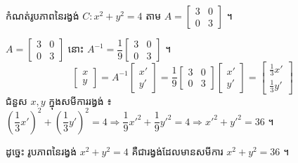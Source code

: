 \begin{example}[លំហាត់គំរូ ២]
កំណត់រូបភាពនៃរង្វង់ $C : x^2 + y^2 = 4$ តាម $A = \begin{bmatrix} 3 & 0\\ 0 & 3 \end{bmatrix}$ ។
\end{example}
\ans
$A = \begin{bmatrix} 3 & 0\\ 0 & 3 \end{bmatrix}$ នោះ $A^{-1} = \dfrac{1}{9}\begin{bmatrix} 3 & 0\\ 0 & 3 \end{bmatrix}$ ។
\[ \begin{bmatrix} x\\ y \end{bmatrix} = A^{-1}\begin{bmatrix} x'\\ y' \end{bmatrix} = \frac{1}{9}\begin{bmatrix} 3 & 0\\ 0 & 3 \end{bmatrix}\begin{bmatrix} x'\\ y' \end{bmatrix} = \begin{bmatrix} \frac{1}{3}x'\\[2pt] \frac{1}{3}y' \end{bmatrix} \]
ជំនួស $x, y$ ក្នុងសមីការរង្វង់ ៖ $\left(\dfrac{1}{3}x'\right)^2 + \left(\dfrac{1}{3}y'\right)^2 = 4 \Rightarrow \dfrac{1}{9}x'^2 + \dfrac{1}{9}y'^2 = 4 \Rightarrow x'^2 + y'^2 = 36$ ។

ដូច្នេះ រូបភាពនៃរង្វង់ $x^2 + y^2 = 4$ គឺជារង្វង់ដែលមានសមីការ $x^2 + y^2 = 36$ ។

\begin{center}
\end{center}

